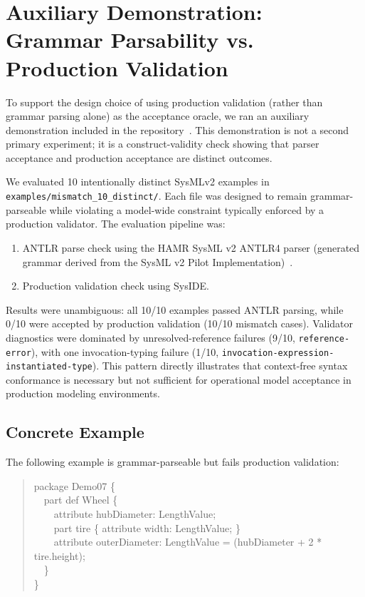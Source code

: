 \section{Auxiliary Demonstration: Grammar Parsability vs. Production Validation}
\label{appendix:antlr_vs_syside}

To support the design choice of using production validation (rather than grammar parsing alone) as the acceptance oracle, we ran an auxiliary demonstration included in the repository~\cite{sysmbenchCompilerLoopRepo2026}. This demonstration is not a second primary experiment; it is a construct-validity check showing that parser acceptance and production acceptance are distinct outcomes.

We evaluated 10 intentionally distinct SysMLv2 examples in \texttt{examples/mismatch\_10\_distinct/}. Each file was designed to remain grammar-parseable while violating a model-wide constraint typically enforced by a production validator. The evaluation pipeline was:
\begin{enumerate}
    \item ANTLR parse check using the HAMR SysML v2 ANTLR4 parser (generated grammar derived from the SysML v2 Pilot Implementation)~\cite{hamrSysmlParser2026,sysmlV2PilotImplementation2026}.
    \item Production validation check using SysIDE.
\end{enumerate}

Results were unambiguous: all 10/10 examples passed ANTLR parsing, while 0/10 were accepted by production validation (10/10 mismatch cases). Validator diagnostics were dominated by unresolved-reference failures (9/10, \texttt{reference-error}), with one invocation-typing failure (1/10, \texttt{invocation-expression-instantiated-type}). This pattern directly illustrates that context-free syntax conformance is necessary but not sufficient for operational model acceptance in production modeling environments.

\subsection*{Concrete Example}
The following example is grammar-parseable but fails production validation:
\begin{quote}
\small\ttfamily
package Demo07 \{\\
\ \ part def Wheel \{\\
\ \ \ \ attribute hubDiameter: LengthValue;\\
\ \ \ \ part tire \{ attribute width: LengthValue; \}\\
\ \ \ \ attribute outerDiameter: LengthValue = (hubDiameter + 2 * tire.height);\\
\ \ \}\\
\}
\end{quote}

